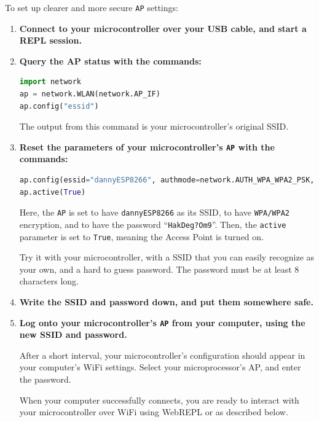 To set up clearer and more secure \texttt{AP} settings:
\begin{enumerate}
	\item \textbf{Connect to your microcontroller over your USB cable, and start a REPL session.} 
	\item \textbf{Query the AP status with the commands:}
\begin{lstlisting}[language=Python]
import network
ap = network.WLAN(network.AP_IF)
ap.config("essid")
\end{lstlisting}
	The output from this command is your microcontroller's original SSID.

	\item \textbf{Reset the parameters of your microcontroller's \texttt{AP} with the commands:}
\begin{lstlisting}[language=Python]
ap.config(essid="dannyESP8266", authmode=network.AUTH_WPA_WPA2_PSK, password="HakDeg?Om9")
ap.active(True)
\end{lstlisting}
	Here, the \texttt{AP} is set to have \verb|dannyESP8266| as its SSID, to have \texttt{WPA/WPA2} encryption, and to have the password ``\verb|HakDeg?Om9|''.
	Then, the \texttt{active} parameter is set to \lstinline|True|, meaning the Access Point is turned on. 
	
	Try it with your microcontroller, with a SSID that you can easily recognize as your own, and a hard to guess password.
	The password must be at least 8 characters long.	
	
	 
	\item \textbf{Write the SSID and password down, and put them somewhere safe.}	
	
	\item \textbf{Log onto your microcontroller's \texttt{AP} from your computer, using the new SSID and password.}

	After a short interval, your microcontroller's configuration should appear in your computer's WiFi settings.
	Select your microprocessor's AP, and enter the password. 
	
	When your computer successfully connects, you are ready to interact with your microcontroller over WiFi using WebREPL or \mpfshell as described below.	
\end{enumerate}

